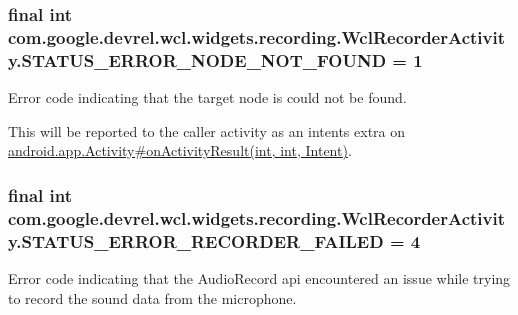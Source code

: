 \subsubsection[{\texorpdfstring{S\+T\+A\+T\+U\+S\+\_\+\+E\+R\+R\+O\+R\+\_\+\+N\+O\+D\+E\+\_\+\+N\+O\+T\+\_\+\+F\+O\+U\+ND}{STATUS_ERROR_NODE_NOT_FOUND}}]{\setlength{\rightskip}{0pt plus 5cm}final int com.\+google.\+devrel.\+wcl.\+widgets.\+recording.\+Wcl\+Recorder\+Activity.\+S\+T\+A\+T\+U\+S\+\_\+\+E\+R\+R\+O\+R\+\_\+\+N\+O\+D\+E\+\_\+\+N\+O\+T\+\_\+\+F\+O\+U\+ND = 1\hspace{0.3cm}{\ttfamily [static]}}\hypertarget{classcom_1_1google_1_1devrel_1_1wcl_1_1widgets_1_1recording_1_1WclRecorderActivity_a4b4c947e0d87f688749786885282a1f8}{}\label{classcom_1_1google_1_1devrel_1_1wcl_1_1widgets_1_1recording_1_1WclRecorderActivity_a4b4c947e0d87f688749786885282a1f8}
Error code indicating that the target node is could not be found.

This will be reported to the caller activity as an intent\textquotesingle{}s extra on \hyperlink{}{android.\+app.\+Activity\#on\+Activity\+Result(int, int, Intent)}. 
\subsubsection[{\texorpdfstring{S\+T\+A\+T\+U\+S\+\_\+\+E\+R\+R\+O\+R\+\_\+\+R\+E\+C\+O\+R\+D\+E\+R\+\_\+\+F\+A\+I\+L\+ED}{STATUS_ERROR_RECORDER_FAILED}}]{\setlength{\rightskip}{0pt plus 5cm}final int com.\+google.\+devrel.\+wcl.\+widgets.\+recording.\+Wcl\+Recorder\+Activity.\+S\+T\+A\+T\+U\+S\+\_\+\+E\+R\+R\+O\+R\+\_\+\+R\+E\+C\+O\+R\+D\+E\+R\+\_\+\+F\+A\+I\+L\+ED = 4\hspace{0.3cm}{\ttfamily [static]}}\hypertarget{classcom_1_1google_1_1devrel_1_1wcl_1_1widgets_1_1recording_1_1WclRecorderActivity_a7806794abe1851ef4bf387d01cc6e83d}{}\label{classcom_1_1google_1_1devrel_1_1wcl_1_1widgets_1_1recording_1_1WclRecorderActivity_a7806794abe1851ef4bf387d01cc6e83d}
Error code indicating that the Audio\+Record api encountered an issue while trying to record the sound data from the microphone.

